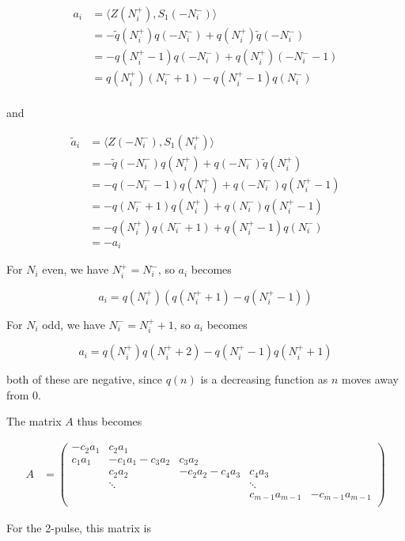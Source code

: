 \documentclass[12pt]{article}
\begin{document}
\begin{enumerate}
\begin{align*}
a_i &= \langle Z(N_i^+), S_1(-N_i^-) \rangle \\
&= -\tilde{q}(N_i^+)q(-N_i^-) + q(N_i^+)\tilde{q}(-N_i^-) \\
&= -q(N_i^+ - 1)q(-N_i^-) + q(N_i^+)(-N_i^- - 1) \\
&= q(N_i^+)(N_i^- + 1) - q(N_i^+ - 1)q(N_i^-)\\
\end{align*}

and

\begin{align*}
\tilde{a}_i &= \langle Z(-N_i^-), S_1(N_i^+) \rangle \\
&= -\tilde{q}(-N_i^-)q(N_i^+) + q(-N_i^-)\tilde{q}(N_i^+) \\
&= -q(-N_i^- - 1)q(N_i^+) + q(-N_i^-)q(N_i^+ - 1) \\
&= -q(N_i^- + 1)q(N_i^+) + q(N_i^-)q(N_i^+ - 1) \\
&= -q(N_i^+)q(N_i^- + 1) + q(N_i^+ - 1)q(N_i^-) \\
&= -a_i
\end{align*}

For $N_i$ even, we have $N_i^+ = N_i^-$, so $a_i$ becomes

\[
a_i = q(N_i^+)( q(N_i^+ + 1) - q(N_i^+ - 1) )
\]

For $N_i$ odd, we have $N_i^- = N_i^+ + 1$, so $a_i$ becomes

\[
a_i = q(N_i^+)q(N_i^+ + 2) - q(N_i^+ - 1)q(N_i^+ + 1)
\]

both of these are negative, since $q(n)$ is a decreasing function as $n$ moves away from 0.

\end{enumerate}

The matrix $A$ thus becomes

\begin{align*}
A &= \begin{pmatrix}
-c_2 a_1 & c_2 a_1 & & &  \\
c_1 a_1 & -c_1 a_1 - c_3 a_2 & c_3 a_2 \\
& c_2 a_2 & -c_2 a_2 - c_4 a_3 & c_4 a_3 \\
& \ddots & & \ddots \\
& & & c_{m-1} a_{m-1} & -c_{m-1} a_{m-1}  \\
\end{pmatrix}
\end{align*}

For the 2-pulse, this matrix is
\end{document}
